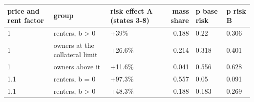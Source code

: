 \begingroup\small
\setlength{\tabcolsep}{3pt}
\renewcommand{\arraystretch}{1.04}
\begin{tabularx}{\linewidth}{XXXrXX}
\toprule
price and rent factor & group & risk effect A (states 3-8) & mass share & p base risk & p risk B \\
\midrule
1 & renters, b \textgreater{} 0 & +39\% & 0.188 & 0.22 & 0.306 \\
1 & owners at the collateral limit & +26.6\% & 0.214 & 0.318 & 0.401 \\
1 & owners above it & +11.6\% & 0.041 & 0.556 & 0.628 \\
1.1 & renters, b = 0 & +97.3\% & 0.557 & 0.05 & 0.091 \\
1.1 & renters, b \textgreater{} 0 & +48.3\% & 0.188 & 0.183 & 0.269 \\
\bottomrule
\end{tabularx}
\endgroup
